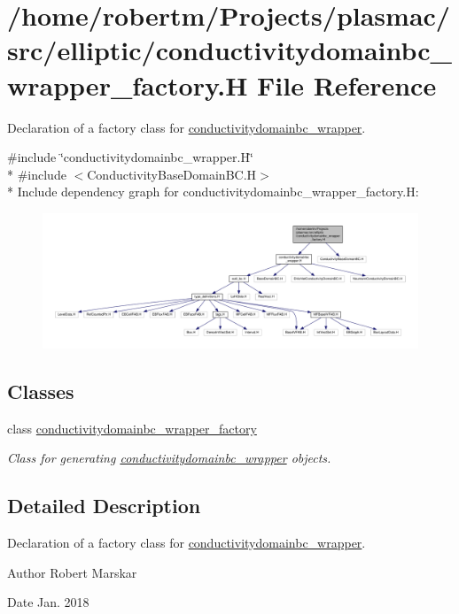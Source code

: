 \hypertarget{conductivitydomainbc__wrapper__factory_8H}{}\section{/home/robertm/\+Projects/plasmac/src/elliptic/conductivitydomainbc\+\_\+wrapper\+\_\+factory.H File Reference}
\label{conductivitydomainbc__wrapper__factory_8H}


Declaration of a factory class for \hyperlink{classconductivitydomainbc__wrapper}{conductivitydomainbc\+\_\+wrapper}.  


{\ttfamily \#include \char`\"{}conductivitydomainbc\+\_\+wrapper.\+H\char`\"{}}\\*
{\ttfamily \#include $<$Conductivity\+Base\+Domain\+B\+C.\+H$>$}\\*
Include dependency graph for conductivitydomainbc\+\_\+wrapper\+\_\+factory.\+H\+:\nopagebreak
\begin{figure}[H]
\begin{center}
\leavevmode
\includegraphics[width=350pt]{conductivitydomainbc__wrapper__factory_8H__incl}
\end{center}
\end{figure}
\subsection*{Classes}
\begin{DoxyCompactItemize}
\item 
class \hyperlink{classconductivitydomainbc__wrapper__factory}{conductivitydomainbc\+\_\+wrapper\+\_\+factory}
\begin{DoxyCompactList}\small\item\em Class for generating \hyperlink{classconductivitydomainbc__wrapper}{conductivitydomainbc\+\_\+wrapper} objects. \end{DoxyCompactList}\end{DoxyCompactItemize}


\subsection{Detailed Description}
Declaration of a factory class for \hyperlink{classconductivitydomainbc__wrapper}{conductivitydomainbc\+\_\+wrapper}. 

\begin{DoxyAuthor}{Author}
Robert Marskar 
\end{DoxyAuthor}
\begin{DoxyDate}{Date}
Jan. 2018 
\end{DoxyDate}

